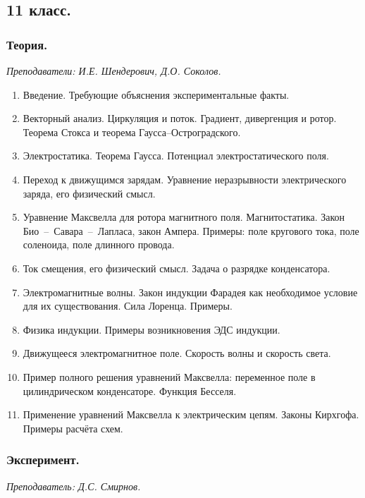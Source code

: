 \documentclass[11pt]{article}
\newlength{\h}
\newlength{\x}
\begin{document}
\subsection{11 класс.}
\label{sec:daily11}

\subsubsection{Теория.}
\label{sec:th11}

\textit{Преподаватели: И.Е. Шендерович, Д.О. Соколов.}

\begin{enumerate}
\item Введение. Требующие объяснения экспериментальные факты.
\item Векторный анализ. Циркуляция и поток. Градиент, дивергенция и
  ротор. Теорема Стокса и теорема Гаусса--Остроградского.
\item Электростатика. Теорема Гаусса. Потенциал электростатического
  поля.
\item Переход к движущимся зарядам. Уравнение неразрывности
  электрического заряда, его физический смысл.
\item Уравнение Максвелла для ротора магнитного
  поля. Магнитостатика. Закон Био~--~Савара~--~Лапласа, закон
  Ампера. Примеры: поле кругового тока, поле соленоида, поле длинного
  провода.
\item Ток смещения, его физический смысл. Задача о разрядке
  конденсатора.
\item Электромагнитные волны. Закон индукции Фарадея как необходимое
  условие для их существования. Сила Лоренца. Примеры.
\item Физика индукции. Примеры возникновения ЭДС индукции.
\item Движущееся электромагнитное поле. Скорость волны и скорость
  света.
\item Пример полного решения уравнений Максвелла: переменное поле в
  цилиндрическом конденсаторе. Функция Бесселя.
\item Применение уравнений Максвелла к электрическим цепям. Законы
  Кирхгофа. Примеры расчёта схем. 
\end{enumerate}

\subsubsection{Эксперимент.}
\label{sec:exp11}

\textit{Преподаватель: Д.С. Смирнов.}\\
\end{document}
